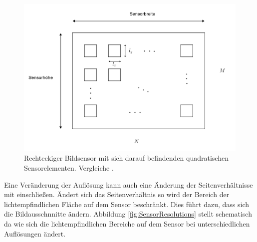 \begin{figure}[!htb]
	\centering
	\includegraphics[width=.8\linewidth]{images/Bildsensor_mit_Pixel.png}
	\caption[Aufbau von CMOS-Sensoren]{Rechteckiger Bildsensor mit sich darauf befindenden quadratischen Sensorelementen. Vergleiche \cite{Photonik}.} 
	\label{fig:Sensor}
\end{figure}
\pagebreak

Eine Veränderung der Auflösung kann auch eine Änderung der Seitenverhältnisse mit einschließen. Ändert sich das Seitenverhältnis so wird der Bereich der lichtempfindlichen Fläche auf dem Sensor beschränkt\cite{Photonik}. Dies führt dazu, dass sich die Bildausschnnitte ändern. Abbildung \ref{fig:SensorResolutions} stellt schematisch da wie sich die lichtempfindlichen Bereiche auf dem Sensor bei unterschiedlichen Auflösungen ändert.







